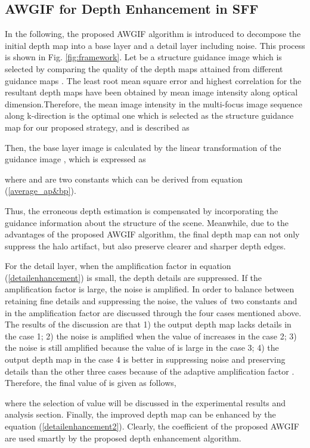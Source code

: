 \documentclass[a4paper,fleqn]{cas-dc}
\begin{document}
\subsection{AWGIF for Depth Enhancement in SFF}\label{Enhancement}
In the following, the proposed AWGIF algorithm is introduced to decompose the initial depth map  into a base layer  and a detail layer  including noise. This process is shown in Fig. \ref{fig:framework}. Let  be a structure guidance image which is selected by comparing the quality of the depth maps attained from different guidance maps \cite{ali2021guided}. The least root mean square error and highest correlation for the resultant depth maps have been obtained by mean image intensity along optical dimension.Therefore, the mean image intensity in the multi-focus image sequence  along k-direction is the optimal one which is selected as the structure guidance map  for our proposed strategy, and is described as
		
Then, the base layer image  is calculated by the linear transformation of the guidance image , which is expressed as

where  and  are two constants which can be derived from equation (\ref{average_ap&bp}).

Thus, the erroneous depth estimation is compensated by incorporating the guidance information about the structure of the scene. Meanwhile, due to the advantages of the proposed AWGIF algorithm, the final depth map can not only suppress the halo artifact, but also preserve clearer and sharper depth edges.

For the detail layer, when the amplification factor  in equation (\ref{detailenhancement}) is small, the depth details are suppressed. If the amplification factor is large, the noise is amplified. In order to balance between retaining fine details and suppressing the noise, the values of two constants  and  in the amplification factor are discussed through the four cases mentioned above. The results of the discussion are that 1) the output depth map  lacks details in the case 1; 2) the noise is amplified when the value of  increases in the case 2; 3) the noise is still amplified because the value of  is large in the case 3; 4) the output depth map  in the case 4 is better in suppressing noise and preserving details than the other three cases because of the adaptive amplification factor . Therefore, the final value of  is given as follows,

where the selection of  value will be discussed in the experimental results and analysis section. Finally, the improved depth map can be enhanced by the equation (\ref{detailenhancement2}). Clearly, the coefficient of the proposed AWGIF are used smartly by the proposed depth enhancement algorithm.
\end{document}
